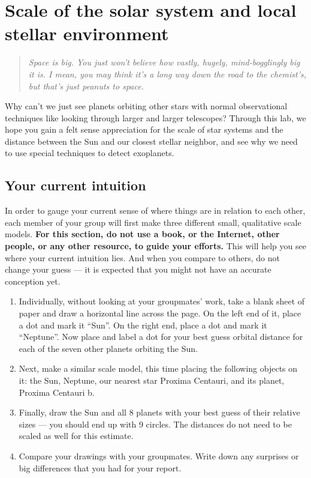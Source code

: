 \chapter{Scale of the solar system and local stellar environment}


\begin{quotation}
	\textit{Space is big. You just won't believe how vastly, hugely, mind-bogglingly big it is. I mean, you may think it's a long way down the road to the chemist's, but that's just peanuts to space.} 
\end{quotation}

Why can't we just see planets orbiting other stars with normal observational techniques like looking through larger and larger telescopes? Through this lab, we hope you gain a felt sense appreciation for the scale of star systems and the distance between the Sun and our closest stellar neighbor, and see why we need to use special techniques to detect exoplanets.

\section{Your current intuition}\label{se:sec:intuition}

In order to gauge your current sense of where things are in relation to each other, each member of your group will first make three different small, qualitative scale models. \textbf{For this section, do not use a book, or the Internet, other people, or any other resource, to guide your efforts.} This will help you see where your current intuition lies. And when you compare to others, do not change your guess --- it is expected that you might not have an accurate conception yet.

\begin{enumerate}
	\item Individually, without looking at your groupmates' work, take a blank sheet of paper and draw a horizontal line across the page. On the left end of it, place a dot and mark it ``Sun''. On the right end, place a dot and mark it ``Neptune''. Now place and label a dot for your best guess orbital distance for each of the seven other planets orbiting the Sun.

	\item Next, make a similar scale model, this time placing the following objects on it: the Sun, Neptune, our nearest star Proxima Centauri, and its planet, Proxima Centauri b.
	
	\item Finally, draw the Sun and all 8 planets with your best guess of their relative sizes --- you should end up with 9 circles. The distances do not need to be scaled as well for this estimate.

	\item Compare your drawings with your groupmates. Write down any surprises or big differences that you had for your report.
\end{enumerate}

